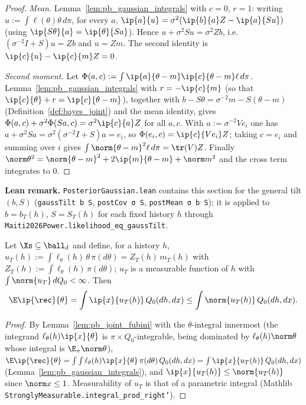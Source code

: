 \begin{proof}
\leanok
{}
\emph{Mean.} Lemma~\ref{lem:pb_gaussian_integrals} with $c = 0$, $r = 1$: writing
$u := \int\ell(\theta)\theta\,d\pi$, for every $a$,
$\ip{a}{u} = \sigma^2(\ip{b}{a}Z - \ip{a}{Su})$ (using $\ip{S\theta}{a} = \ip{\theta}{Sa}$).
Hence $u + \sigma^2Su = \sigma^2Zb$, i.e.\ $(\sigma^{-2}I+S)u = Zb$ and $u = Zm$. The second
identity is $\ip{c}{u} - \ip{c}{m}Z = 0$.

\emph{Second moment.} Let $\Phi(a,c) := \int\ip{a}{\theta-m}\ip{c}{\theta-m}\ell\,d\pi$.
Lemma~\ref{lem:pb_gaussian_integrals} with $r = -\ip{c}{m}$ (so that
$\ip{c}{\theta}+r = \ip{c}{\theta-m}$), together with
$b - S\theta = \sigma^{-2}m - S(\theta-m)$ (Definition~\ref{def:bayes_joint}) and the mean
identity, gives $\Phi(a,c) + \sigma^2\Phi(Sa,c) = \sigma^2\ip{c}{a}Z$ for all $a, c$. With
$a := \sigma^{-2}Ve_i$ one has $a + \sigma^2Sa = \sigma^2(\sigma^{-2}I+S)a = e_i$, so
$\Phi(e_i,c) = \ip{c}{Ve_i}Z$; taking $c = e_i$ and summing over $i$ gives
$\int\norm{\theta-m}^2\ell\,d\pi = \tr(V)Z$. Finally
$\norm\theta^2 = \norm{\theta-m}^2 + 2\ip{m}{\theta-m} + \norm m^2$ and the cross term
integrates to $0$.
\end{proof}

\textbf{Lean remark.} \texttt{PosteriorGaussian.lean} contains this section for the general tilt
$(b, S)$ (\texttt{gaussTilt b S}, \texttt{postCov σ S}, \texttt{postMean σ b S}); it is applied
to $b = b_T(h)$, $S = S_T(h)$ for each fixed history $h$ through
\texttt{Maiti2026Power.likelihood\_eq\_gaussTilt}.

\begin{lemma}\label{lem:posterior_mean}
\leanok
{}
Let $\Xs \subseteq \ball_d$ and define, for a history $h$,
$u_T(h) := \int\ell_\theta(h)\,\theta\,\pi(d\theta) = Z_T(h)\,m_T(h)$ with
$Z_T(h) := \int\ell_\theta(h)\,\pi(d\theta)$; $u_T$ is a measurable function of $h$ with
$\int\norm{u_T}\,dQ_0 < \infty$. Then
\[
  \E\ip{\rec}{\theta} = \int\ip{x}{u_T(h)}\,Q_0(dh,dx) \le \int\norm{u_T(h)}\,Q_0(dh,dx) .
\]
\end{lemma}

\begin{proof}
\leanok
{}
By Lemma~\ref{lem:pb_joint_fubini} with the $\theta$-integral innermost (the integrand
$\ell_\theta(h)\ip{x}{\theta}$ is $\pi\times Q_0$-integrable, being dominated by
$\ell_\theta(h)\norm\theta$ whose integral is $\E_\pi\norm\theta$),
$\E\ip{\rec}{\theta} = \int\int\ell_\theta(h)\ip{x}{\theta}\,\pi(d\theta)\,Q_0(dh,dx)
= \int\ip{x}{u_T(h)}\,Q_0(dh,dx)$ (Lemma~\ref{lem:pb_gaussian_integrals}), and
$\ip{x}{u_T(h)} \le \norm{u_T(h)}$ since $\norm x\le1$. Measurability of $u_T$ is that of a
parametric integral (Mathlib \texttt{StronglyMeasurable.integral\_prod\_right'}).
\end{proof}


